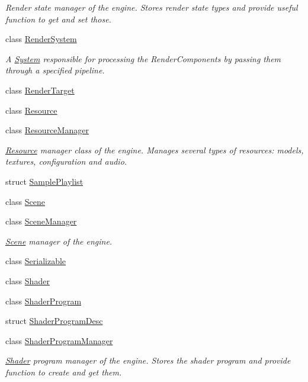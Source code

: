 \begin{DoxyCompactItemize}
\begin{DoxyCompactList}\small\item\em Render state manager of the engine. Stores render state types and provide useful function to get and set those. \end{DoxyCompactList}\item 
class \hyperlink{class_blade_1_1_render_system}{Render\+System}
\begin{DoxyCompactList}\small\item\em A \hyperlink{class_blade_1_1_system}{System} responsible for processing the Render\+Components by passing them through a specified pipeline. \end{DoxyCompactList}\item 
class \hyperlink{class_blade_1_1_render_target}{Render\+Target}
\item 
class \hyperlink{class_blade_1_1_resource}{Resource}
\item 
class \hyperlink{class_blade_1_1_resource_manager}{Resource\+Manager}
\begin{DoxyCompactList}\small\item\em \hyperlink{class_blade_1_1_resource}{Resource} manager class of the engine. Manages several types of resources\+: models, textures, configuration and audio. \end{DoxyCompactList}\item 
struct \hyperlink{struct_blade_1_1_sample_playlist}{Sample\+Playlist}
\item 
class \hyperlink{class_blade_1_1_scene}{Scene}
\item 
class \hyperlink{class_blade_1_1_scene_manager}{Scene\+Manager}
\begin{DoxyCompactList}\small\item\em \hyperlink{class_blade_1_1_scene}{Scene} manager of the engine. \end{DoxyCompactList}\item 
class \hyperlink{class_blade_1_1_serializable}{Serializable}
\item 
class \hyperlink{class_blade_1_1_shader}{Shader}
\item 
class \hyperlink{class_blade_1_1_shader_program}{Shader\+Program}
\item 
struct \hyperlink{struct_blade_1_1_shader_program_desc}{Shader\+Program\+Desc}
\item 
class \hyperlink{class_blade_1_1_shader_program_manager}{Shader\+Program\+Manager}
\begin{DoxyCompactList}\small\item\em \hyperlink{class_blade_1_1_shader}{Shader} program manager of the engine. Stores the shader program and provide function to create and get them. \end{DoxyCompactList}\item 

\end{DoxyCompactItemize}
